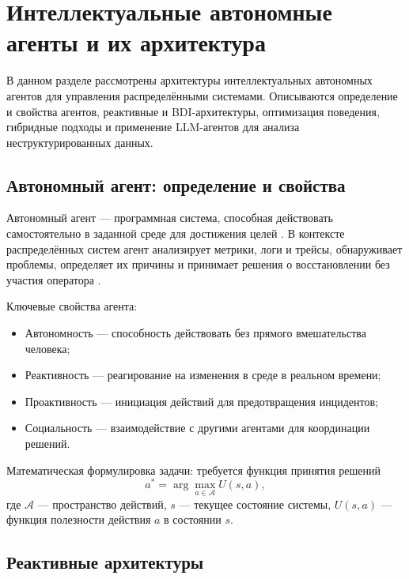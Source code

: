 \chapter{Интеллектуальные автономные агенты и их архитектура}\label{ch:agents}

В данном разделе рассмотрены архитектуры интеллектуальных автономных агентов для управления распределёнными системами. Описываются определение и свойства агентов, реактивные и BDI-архитектуры, оптимизация поведения, гибридные подходы и применение LLM-агентов для анализа неструктурированных данных.

\section{Автономный агент: определение и свойства}

Автономный агент --- программная система, способная действовать самостоятельно в заданной среде для достижения целей \cite{wooldridge_agents,russian_agents}. В контексте распределённых систем агент анализирует метрики, логи и трейсы, обнаруживает проблемы, определяет их причины и принимает решения о восстановлении без участия оператора \cite{autonomous_agents_phd}.

Ключевые свойства агента:
\begin{itemize}
    \item Автономность --- способность действовать без прямого вмешательства человека;
    \item Реактивность --- реагирование на изменения в среде в реальном времени;
    \item Проактивность --- инициация действий для предотвращения инцидентов;
    \item Социальность --- взаимодействие с другими агентами для координации решений.
\end{itemize}

Математическая формулировка задачи: требуется функция принятия решений
\begin{equation}
  a^* = \arg\max_{a \in \mathcal{A}} U(s, a),
  \label{eq:decision_problem}
\end{equation}
где $\mathcal{A}$ --- пространство действий, $s$ --- текущее состояние системы, $U(s, a)$ --- функция полезности действия $a$ в состоянии $s$.

\section{Реактивные архитектуры}

